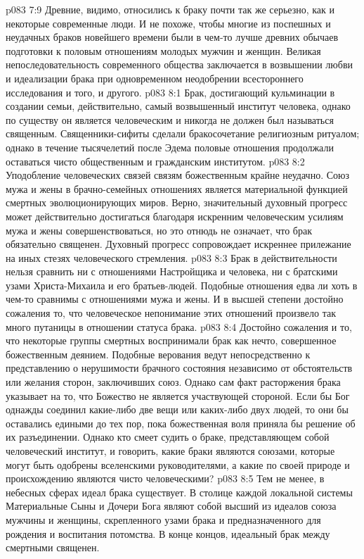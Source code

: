 \vs p083 7:9 \pc Древние, видимо, относились к браку почти так же серьезно, как и некоторые современные люди. И не похоже, чтобы многие из поспешных и неудачных браков новейшего времени были в чем\hyp{}то лучше древних обычаев подготовки к половым отношениям молодых мужчин и женщин. Великая непоследовательность современного общества заключается в возвышении любви и идеализации брака при одновременном неодобрении всестороннего исследования и того, и другого.
\vs p083 8:1 Брак, достигающий кульминации в создании семьи, действительно, самый возвышенный институт человека, однако по существу он является человеческим и никогда не должен был называться священным. Священники\hyp{}сифиты сделали бракосочетание религиозным ритуалом; однако в течение тысячелетий после Эдема половые отношения продолжали оставаться чисто общественным и гражданским институтом.
\vs p083 8:2 Уподобление человеческих связей связям божественным крайне неудачно. Союз мужа и жены в брачно\hyp{}семейных отношениях является материальной функцией смертных эволюционирующих миров. Верно, значительный духовный прогресс может действительно достигаться благодаря искренним человеческим усилиям мужа и жены совершенствоваться, но это отнюдь не означает, что брак обязательно священен. Духовный прогресс сопровождает искреннее прилежание на иных стезях человеческого стремления.
\vs p083 8:3 Брак в действительности нельзя сравнить ни с отношениями Настройщика и человека, ни с братскими узами Христа\hyp{}Михаила и его братьев\hyp{}людей. Подобные отношения едва ли хоть в чем\hyp{}то сравнимы с отношениями мужа и жены. И в высшей степени достойно сожаления то, что человеческое непонимание этих отношений произвело так много путаницы в отношении статуса брака.
\vs p083 8:4 Достойно сожаления и то, что некоторые группы смертных воспринимали брак как нечто, совершенное божественным деянием. Подобные верования ведут непосредственно к представлению о нерушимости брачного состояния независимо от обстоятельств или желания сторон, заключивших союз. Однако сам факт расторжения брака указывает на то, что Божество не является участвующей стороной. Если бы Бог однажды соединил какие\hyp{}либо две вещи или каких\hyp{}либо двух людей, то они бы оставались едиными до тех пор, пока божественная воля приняла бы решение об их разъединении. Однако кто смеет судить о браке, представляющем собой человеческий институт, и говорить, какие браки являются союзами, которые могут быть одобрены вселенскими руководителями, а какие по своей природе и происхождению являются чисто человеческими?
\vs p083 8:5 Тем не менее, в небесных сферах идеал брака существует. В столице каждой локальной системы Материальные Сыны и Дочери Бога являют собой высший из идеалов союза мужчины и женщины, скрепленного узами брака и предназначенного для рождения и воспитания потомства. В конце концов, идеальный брак между смертными  священен.
